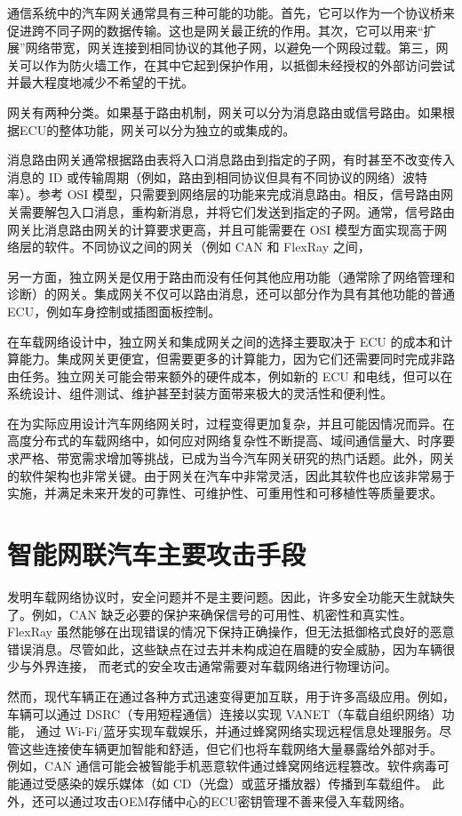 通信系统中的汽车网关通常具有三种可能的功能。首先，它可以作为一个协议桥来促进跨不同子网的数据传输。这也是网关最正统的作用。其次，它可以用来“扩展”网络带宽，网关连接到相同协议的其他子网，以避免一个网段过载。第三，网关可以作为防火墙工作，在其中它起到保护作用，以抵御未经授权的外部访问尝试并最大程度地减少不希望的干扰。

网关有两种分类。如果基于路由机制，网关可以分为消息路由或信号路由。如果根据ECU的整体功能，网关可以分为独立的或集成的。

消息路由网关通常根据路由表将入口消息路由到指定的子网，有时甚至不改变传入消息的 ID 或传输周期（例如，路由到相同协议但具有不同协议的网络）波特率）。参考 OSI 模型，只需要到网络层的功能来完成消息路由。相反，信号路由网关需要解包入口消息，重构新消息，并将它们发送到指定的子网。通常，信号路由网关比消息路由网关的计算要求更高，并且可能需要在 OSI 模型方面实现高于网络层的软件。不同协议之间的网关（例如 CAN 和 FlexRay 之间，

另一方面，独立网关是仅用于路由而没有任何其他应用功能（通常除了网络管理和诊断）的网关。集成网关不仅可以路由消息，还可以部分作为具有其他功能的普通 ECU，例如车身控制或插图面板控制。

在车载网络设计中，独立网关和集成网关之间的选择主要取决于 ECU 的成本和计算能力。集成网关更便宜，但需要更多的计算能力，因为它们还需要同时完成非路由任务。独立网关可能会带来额外的硬件成本，例如新的 ECU 和电线，但可以在系统设计、组件测试、维护甚至封装方面带来极大的灵活性和便利性。

在为实际应用设计汽车网络网关时，过程变得更加复杂，并且可能因情况而异。在高度分布式的车载网络中，如何应对网络复杂性不断提高、域间通信量大、时序要求严格、带宽需求增加等挑战，已成为当今汽车网关研究的热门话题。此外，网关的软件架构也非常关键。由于网关在汽车中非常灵活，因此其软件也应该非常易于实施，并满足未来开发的可靠性、可维护性、可重用性和可移植性等质量要求。
\section{智能网联汽车主要攻击手段}
发明车载网络协议时，安全问题并不是主要问题。因此，许多安全功能天生就缺失了。例如，CAN 缺乏必要的保护来确保信号的可用性、机密性和真实性\cite{woo2014practical}。
FlexRay 虽然能够在出现错误的情况下保持正确操作，但无法抵御格式良好的恶意错误消息\cite{kleberger2011security}。尽管如此，这些缺点在过去并未构成迫在眉睫的安全威胁，因为车辆很少与外界连接，
而老式的安全攻击通常需要对车载网络进行物理访问。

然而，现代车辆正在通过各种方式迅速变得更加互联，用于许多高级应用。例如，车辆可以通过 DSRC（专用短程通信）连接以实现 VANET（车载自组织网络）功能，
通过 Wi-Fi/蓝牙实现车载娱乐，并通过蜂窝网络实现远程信息处理服务。尽管这些连接使车辆更加智能和舒适，但它们也将车载网络大量暴露给外部对手。
例如，CAN 通信可能会被智能手机恶意软件通过蜂窝网络远程篡改\cite{woo2014practical}。软件病毒可能通过受感染的娱乐媒体（如 CD（光盘）或蓝牙播放器）传播到车载组件。
此外，还可以通过攻击OEM存储中心的ECU密钥管理不善来侵入车载网络。

